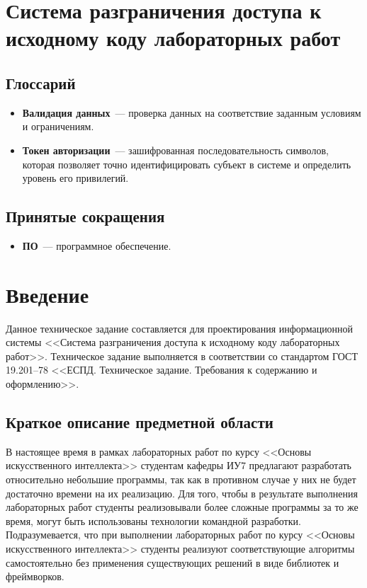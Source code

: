 \documentclass{bmstu}
\begin{document}
  \chapter*{Система разграничения доступа к исходному коду
  лабораторных работ}

  \section*{Глоссарий}

  \begin{itemize}
    \item[] \textbf{Валидация данных}~--- проверка данных на
      соответствие заданным условиям и ограничениям.
    \item[] \textbf{Токен авторизации}~--- зашифрованная
      последовательность символов, которая позволяет точно
      идентифицировать субъект в системе и определить уровень его
      привилегий.
  \end{itemize}

  \section*{Принятые сокращения}

  \begin{itemize}
    \item[] \textbf{ПО}~--- программное обеспечение.
  \end{itemize}

  \chapter{Введение}

  Данное техническое задание составляется для проектирования информационной системы
  <<Система разграничения доступа к исходному коду лабораторных
  работ>>.
  Техническое задание выполняется в соответствии со стандартом ГОСТ
  19.201–78 <<ЕСПД. Техническое задание. Требования к содержанию и
  оформлению>>.

  \section{Краткое описание предметной области}

  В настоящее время в рамках лабораторных работ по курсу <<Основы
  искусственного интеллекта>> студентам кафедры ИУ7 предлагают
  разработать относительно небольшие программы, так как в противном
  случае у них не будет достаточно времени на их реализацию.
  Для того, чтобы в результате выполнения лабораторных работ студенты
  реализовывали более сложные программы за то же время, могут быть
  использованы технологии командной разработки.
  Подразумевается, что при выполнении лабораторных работ по курсу
  <<Основы искусственного интеллекта>> студенты реализуют соответствующие
  алгоритмы самостоятельно без применения существующих решений в
  виде библиотек и фреймворков.
\end{document}
